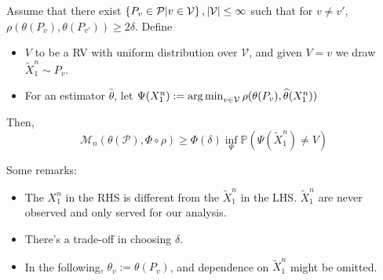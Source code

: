 \documentclass[10pt,xcolor={usenames,dvipsnames,table},aspectratio=169]{beamer}
\begin{document}
\begin{frame}
    \begin{theorem}
        Assume that there exist $\left\{P_v \in \mathcal{P}| v\in \mathcal{V}\right\}, \left\lvert\mathcal{V}\right\rvert \leq \infty$ such that for $v \neq v'$,  $\rho(\theta(P_v), \theta(P_{v'})) \geq 2\delta$.
        Define
        \begin{itemize}
            \item $V$ to be a RV with uniform distribution over  $\mathcal{V}$, and given $V=v$ we draw $\widetilde{X}_1^{n} \sim P_v$.
            \item For an estimator $\widehat{\theta}$, let $\Psi(X_1^{n}) := \operatorname*{arg\,min}_{v \in \mathcal{V}} \rho(\theta(P_v), \widehat{\theta}(X_1^{n}))$
        \end{itemize}
        Then,
        \[
        \mathcal{M}_n(\theta(\mathcal{P}), \Phi \circ \rho) \geq \Phi(\delta) \inf_{\Psi} \mathbb{P}(\Psi(\widetilde{X}_1^{n}) \neq V)
        \] 
    \end{theorem}
    Some remarks:
    \begin{itemize}
        \item The $X_1^{n}$ in the RHS is different from the $\widetilde{X}_1^{n}$ in the LHS. $\widetilde{X}_1^{n}$ are never observed and only served for our analysis.
        \item There's a trade-off in choosing $\delta$. 
        \item In the following, $\theta_v := \theta(P_v)$, and dependence on $\widetilde{X}_1^{n}$ might be omitted.
    \end{itemize}
\end{frame}
\end{document}
